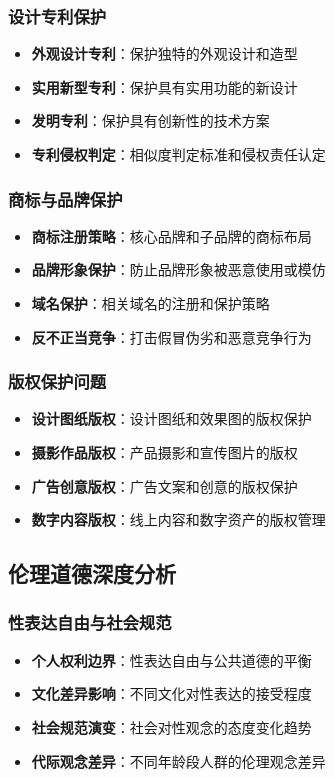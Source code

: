 \documentclass[12pt,UTF8]{ctexbook}
\begin{document}
\subsubsection{设计专利保护}
\begin{itemize}[leftmargin=2cm]
	\item \textbf{外观设计专利}：保护独特的外观设计和造型
	\item \textbf{实用新型专利}：保护具有实用功能的新设计
	\item \textbf{发明专利}：保护具有创新性的技术方案
	\item \textbf{专利侵权判定}：相似度判定标准和侵权责任认定
\end{itemize}

\subsubsection{商标与品牌保护}
\begin{itemize}[leftmargin=2cm]
	\item \textbf{商标注册策略}：核心品牌和子品牌的商标布局
	\item \textbf{品牌形象保护}：防止品牌形象被恶意使用或模仿
	\item \textbf{域名保护}：相关域名的注册和保护策略
	\item \textbf{反不正当竞争}：打击假冒伪劣和恶意竞争行为
\end{itemize}

\subsubsection{版权保护问题}
\begin{itemize}[leftmargin=2cm]
	\item \textbf{设计图纸版权}：设计图纸和效果图的版权保护
	\item \textbf{摄影作品版权}：产品摄影和宣传图片的版权
	\item \textbf{广告创意版权}：广告文案和创意的版权保护
	\item \textbf{数字内容版权}：线上内容和数字资产的版权管理
\end{itemize}

\subsection{伦理道德深度分析}
\subsubsection{性表达自由与社会规范}
\begin{itemize}[leftmargin=2cm]
	\item \textbf{个人权利边界}：性表达自由与公共道德的平衡
	\item \textbf{文化差异影响}：不同文化对性表达的接受程度
	\item \textbf{社会规范演变}：社会对性观念的态度变化趋势
	\item \textbf{代际观念差异}：不同年龄段人群的伦理观念差异
\end{itemize}
\end{document}
